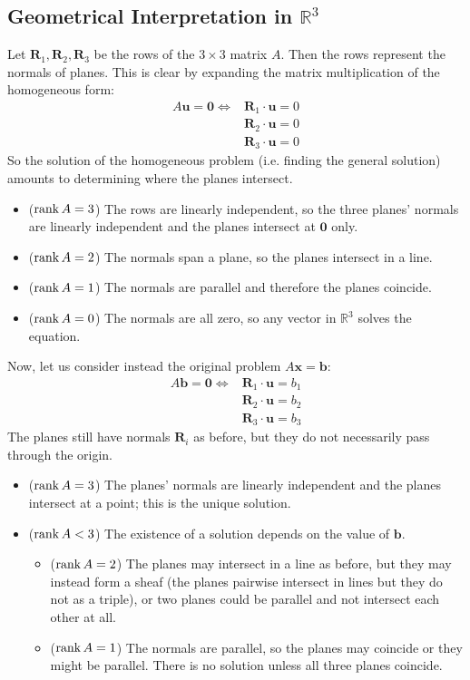 \documentclass{article}
\begin{document}
\subsection{Geometrical Interpretation in $\mathbb R^3$}
Let $\bm R_1, \bm R_2, \bm R_3$ be the rows of the $3 \times 3$ matrix $A$. Then the rows represent the normals of planes. This is clear by expanding the matrix multiplication of the homogeneous form:
\begin{align*}
	A\bm u = \bm 0 \iff & \bm R_1 \cdot \bm u = 0 \\
	                    & \bm R_2 \cdot \bm u = 0 \\
	                    & \bm R_3 \cdot \bm u = 0
\end{align*}
So the solution of the homogeneous problem (i.e. finding the general solution) amounts to determining where the planes intersect.
\begin{itemize}
	\item ($\rank A = 3$) The rows are linearly independent, so the three planes' normals are linearly independent and the planes intersect at $\bm 0$ only.
	\item ($\rank A = 2$) The normals span a plane, so the planes intersect in a line.
	\item ($\rank A = 1$) The normals are parallel and therefore the planes coincide.
	\item ($\rank A = 0$) The normals are all zero, so any vector in $\mathbb R^3$ solves the equation.
\end{itemize}
Now, let us consider instead the original problem $A \bm x = \bm b$:
\begin{align*}
	A\bm b = \bm 0 \iff & \bm R_1 \cdot \bm u = b_1 \\
	                    & \bm R_2 \cdot \bm u = b_2 \\
	                    & \bm R_3 \cdot \bm u = b_3
\end{align*}
The planes still have normals $\bm R_i$ as before, but they do not necessarily pass through the origin.
\begin{itemize}
	\item ($\rank A = 3$) The planes' normals are linearly independent and the planes intersect at a point; this is the unique solution.
	\item ($\rank A < 3$) The existence of a solution depends on the value of $\bm b$.
	      \begin{itemize}
		      \item ($\rank A = 2$) The planes may intersect in a line as before, but they may instead form a sheaf (the planes pairwise intersect in lines but they do not as a triple), or two planes could be parallel and not intersect each other at all.
		      \item ($\rank A = 1$) The normals are parallel, so the planes may coincide or they might be parallel. There is no solution unless all three planes coincide.
	      \end{itemize}
\end{itemize}
\end{document}
